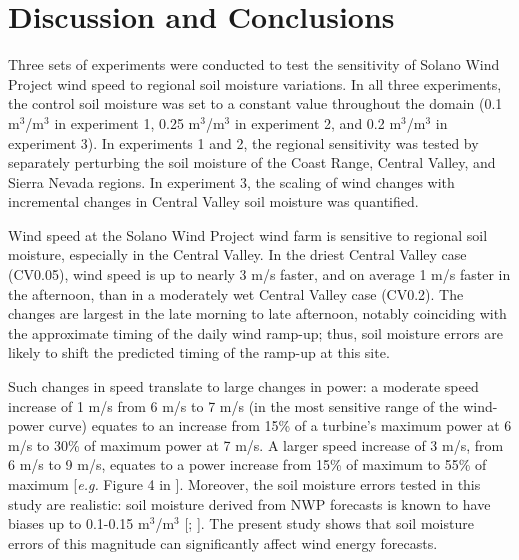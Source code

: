 
\section{Discussion and Conclusions}

Three sets of experiments were conducted to test the sensitivity of Solano Wind Project wind speed to regional soil moisture variations.  In all three experiments, the control soil moisture was set to a constant value throughout the domain (0.1 m$^3$/m$^3$ in experiment 1, 0.25 m$^3$/m$^3$ in experiment 2, and 0.2 m$^3$/m$^3$ in experiment 3).  In experiments 1 and 2, the regional sensitivity was tested by separately perturbing the soil moisture of the Coast Range, Central Valley, and Sierra Nevada regions.  In experiment 3, the scaling of wind changes with incremental changes in Central Valley soil moisture was quantified.

Wind speed at the Solano Wind Project wind farm is sensitive to regional soil moisture, especially in the Central Valley.  In the driest Central Valley case (CV0.05), wind speed is up to nearly 3 m/s faster, and on average 1 m/s faster in the afternoon, than in a moderately wet Central Valley case (CV0.2).  The changes are largest in the late morning to late afternoon, notably coinciding with the approximate timing of the daily wind ramp-up; thus, soil moisture errors are likely to shift the predicted timing of the ramp-up at this site.  

Such changes in speed translate to large changes in power: a moderate speed increase of 1 m/s from 6 m/s to 7 m/s (in the most sensitive range of the wind-power curve) equates to an increase from 15\% of a turbine's maximum power at 6 m/s to 30\% of maximum power at 7 m/s. A larger speed increase of 3 m/s, from 6 m/s to 9 m/s, equates to a power increase from 15\% of maximum to 55\% of maximum [\textit{e.g.} Figure 4 in \cite{wharton2012atmospheric}].  Moreover, the soil moisture errors tested in this study are realistic: soil moisture derived from NWP forecasts is known to have biases up to 0.1-0.15 m$^3$/m$^3$ [\cite{marshall2003impact}; \cite{godfrey2008soil}].  The present study shows that soil moisture errors of this magnitude can significantly affect wind energy forecasts.

